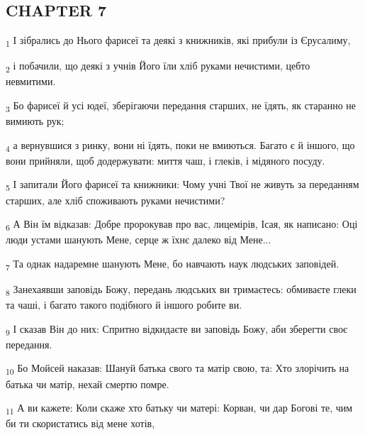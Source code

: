 \subsection{CHAPTER 7}
\begin{tcolorbox}
\textsubscript{1} І зібрались до Нього фарисеї та деякі з книжників, які прибули із Єрусалиму,
\end{tcolorbox}
\begin{tcolorbox}
\textsubscript{2} і побачили, що деякі з учнів Його їли хліб руками нечистими, цебто невмитими.
\end{tcolorbox}
\begin{tcolorbox}
\textsubscript{3} Бо фарисеї й усі юдеї, зберігаючи передання старших, не їдять, як старанно не вимиють рук;
\end{tcolorbox}
\begin{tcolorbox}
\textsubscript{4} а вернувшися з ринку, вони ні їдять, поки не вмиються. Багато є й іншого, що вони прийняли, щоб додержувати: миття чаш, і глеків, і мідяного посуду.
\end{tcolorbox}
\begin{tcolorbox}
\textsubscript{5} І запитали Його фарисеї та книжники: Чому учні Твої не живуть за переданням старших, але хліб споживають руками нечистими?
\end{tcolorbox}
\begin{tcolorbox}
\textsubscript{6} А Він їм відказав: Добре пророкував про вас, лицемірів, Ісая, як написано: Оці люди устами шанують Мене, серце ж їхнє далеко від Мене...
\end{tcolorbox}
\begin{tcolorbox}
\textsubscript{7} Та однак надаремне шанують Мене, бо навчають наук людських заповідей.
\end{tcolorbox}
\begin{tcolorbox}
\textsubscript{8} Занехаявши заповідь Божу, передань людських ви тримаєтесь: обмиваєте глеки та чаші, і багато такого подібного й іншого робите ви.
\end{tcolorbox}
\begin{tcolorbox}
\textsubscript{9} І сказав Він до них: Спритно відкидаєте ви заповідь Божу, аби зберегти своє передання.
\end{tcolorbox}
\begin{tcolorbox}
\textsubscript{10} Бо Мойсей наказав: Шануй батька свого та матір свою, та: Хто злорічить на батька чи матір, нехай смертю помре.
\end{tcolorbox}
\begin{tcolorbox}
\textsubscript{11} А ви кажете: Коли скаже хто батьку чи матері: Корван, чи дар Богові те, чим би ти скористатись від мене хотів,
\end{tcolorbox}
